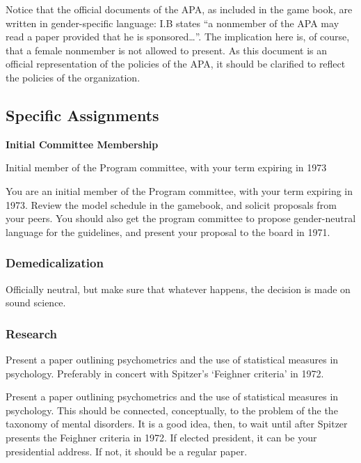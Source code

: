\begin{refsection}
Notice that the official documents of the APA, as included in the game book, are written in gender-specific language: I.B states “a nonmember of the APA may read a paper provided that he is sponsored{\ldots}”. The implication here is, of course, that a female nonmember is not allowed to present. As this document is an official representation of the policies of the APA, it should be clarified to reflect the policies of the organization.

\subsection{Specific Assignments}
\label{specificassignments}

\textbf{Initial Committee Membership}
\begin{service}[Anastasi]\label{service:anastasi}
Initial member of the Program committee, with your term expiring in 1973
\end{service}

You are an initial member of the Program committee, with your term expiring in 1973. Review the model schedule in the gamebook, and solicit proposals from your peers. You should also get the program committee to propose gender-neutral language for the guidelines, and present your proposal to the board in 1971. 

\subsubsection{Demedicalization}
\label{demedicalization}

Officially neutral, but make sure that whatever happens, the decision is made on sound science.

\subsubsection{Research}
\label{research}

\begin{writingtask}[Anastasi]\label{writingtask:anastasi}
Present a paper outlining psychometrics and the use of statistical measures in psychology. Preferably in concert with Spitzer’s ‘Feighner criteria’ in 1972.
\end{writingtask}

Present a paper outlining psychometrics and the use of statistical measures in psychology. This should be connected, conceptually, to the problem of the the taxonomy of mental disorders. It is a good idea, then, to wait until after Spitzer presents the Feighner criteria in 1972. If elected president, it can be your presidential address. If not, it should be a regular paper.


\end{refsection}
